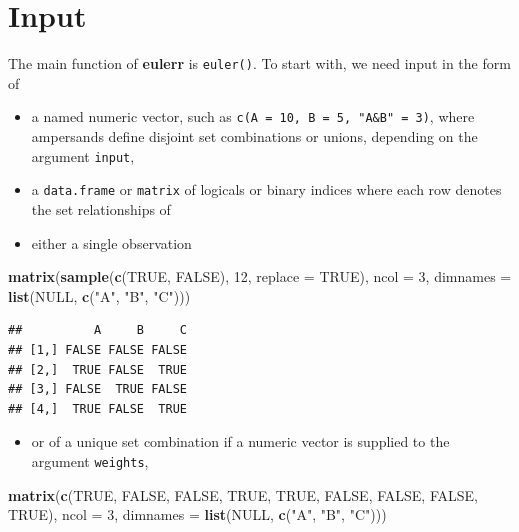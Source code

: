\documentclass[
  headsepline=true,headings=standardclasses%
]{scrartcl}
\newenvironment{Shaded}{\begin{snugshade}}{\end{snugshade}}
\newcommand{\KeywordTok}[1]{\textcolor[rgb]{0.13,0.29,0.53}{\textbf{#1}}}
\newcommand{\DataTypeTok}[1]{\textcolor[rgb]{0.13,0.29,0.53}{#1}}
\newcommand{\DecValTok}[1]{\textcolor[rgb]{0.00,0.00,0.81}{#1}}
\newcommand{\StringTok}[1]{\textcolor[rgb]{0.31,0.60,0.02}{#1}}
\newcommand{\OtherTok}[1]{\textcolor[rgb]{0.56,0.35,0.01}{#1}}
\newcommand{\NormalTok}[1]{#1}
\providecommand{\tightlist}{\setlength{\itemsep}{0pt}\setlength{\parskip}{0pt}}
\theoremstyle{definition}
\theoremstyle{definition}
\theoremstyle{remark}
\begin{document}
\section{Input}\label{input}

The main function of \textbf{eulerr} is \texttt{euler()}. To start with,
we need input in the form of

\begin{itemize}
\tightlist
\item
  a named numeric vector, such as
  \texttt{c(A\ =\ 10,\ B\ =\ 5,\ "A\&B"\ =\ 3)}, where ampersands define
  disjoint set combinations or unions, depending on the argument
  \texttt{input},
\item
  a \texttt{data.frame} or \texttt{matrix} of logicals or binary indices
  where each row denotes the set relationships of
\item
  either a single observation
\end{itemize}

\begin{Shaded}
\begin{Highlighting}[]
\KeywordTok{matrix}\NormalTok{(}\KeywordTok{sample}\NormalTok{(}\KeywordTok{c}\NormalTok{(}\OtherTok{TRUE}\NormalTok{, }\OtherTok{FALSE}\NormalTok{), }\DecValTok{12}\NormalTok{, }\DataTypeTok{replace =} \OtherTok{TRUE}\NormalTok{),}
       \DataTypeTok{ncol =} \DecValTok{3}\NormalTok{,}
       \DataTypeTok{dimnames =} \KeywordTok{list}\NormalTok{(}\OtherTok{NULL}\NormalTok{, }\KeywordTok{c}\NormalTok{(}\StringTok{"A"}\NormalTok{, }\StringTok{"B"}\NormalTok{, }\StringTok{"C"}\NormalTok{)))}
\end{Highlighting}
\end{Shaded}

\begin{verbatim}
##          A     B     C
## [1,] FALSE FALSE FALSE
## [2,]  TRUE FALSE  TRUE
## [3,] FALSE  TRUE FALSE
## [4,]  TRUE FALSE  TRUE
\end{verbatim}

\begin{itemize}
\tightlist
\item
  or of a unique set combination if a numeric vector is supplied to the
  argument \texttt{weights},
\end{itemize}

\begin{Shaded}
\begin{Highlighting}[]
\KeywordTok{matrix}\NormalTok{(}\KeywordTok{c}\NormalTok{(}\OtherTok{TRUE}\NormalTok{, }\OtherTok{FALSE}\NormalTok{, }\OtherTok{FALSE}\NormalTok{,}
         \OtherTok{TRUE}\NormalTok{, }\OtherTok{TRUE}\NormalTok{, }\OtherTok{FALSE}\NormalTok{,}
         \OtherTok{FALSE}\NormalTok{, }\OtherTok{FALSE}\NormalTok{, }\OtherTok{TRUE}\NormalTok{),}
       \DataTypeTok{ncol =} \DecValTok{3}\NormalTok{,}
       \DataTypeTok{dimnames =} \KeywordTok{list}\NormalTok{(}\OtherTok{NULL}\NormalTok{, }\KeywordTok{c}\NormalTok{(}\StringTok{"A"}\NormalTok{, }\StringTok{"B"}\NormalTok{, }\StringTok{"C"}\NormalTok{)))}
\end{Highlighting}
\end{Shaded}
\end{document}
